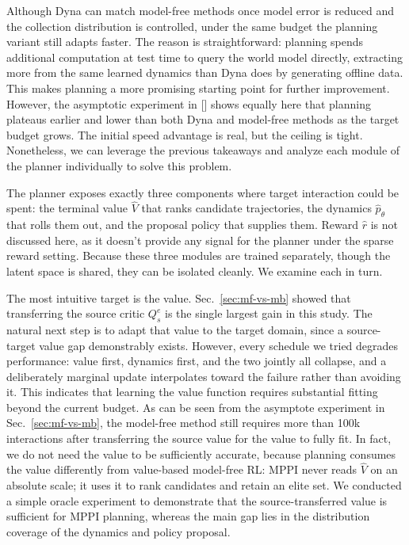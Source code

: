 \documentclass{article} %
\begin{document}
Although Dyna can match model-free methods once model error is reduced and the collection distribution is controlled, under the same budget the planning variant still adapts faster. The reason is straightforward: planning spends additional computation at test time to query the world model directly, extracting more from the same learned dynamics than Dyna does by generating offline data. This makes planning a more promising starting point for further improvement. However, the asymptotic experiment in [] shows equally here that planning plateaus earlier and lower than both Dyna and model-free methods as the target budget grows. The initial speed advantage is real, but the ceiling is tight. Nonetheless, we can leverage the previous takeaways and analyze each module of the planner individually to solve this problem.

The planner exposes exactly three components where target interaction could be spent: the terminal value $\hat V$ that ranks candidate trajectories, the dynamics $\hat p_\theta$ that rolls them out, and the proposal policy that supplies them. Reward $\hat r$ is not discussed here, as it doesn't provide any signal for the planner under the sparse reward setting. Because these three modules are trained separately, though the latent space is shared, they can be isolated cleanly. We examine each in turn.

The most intuitive target is the value. Sec.~\ref{sec:mf-vs-mb} showed that transferring the source critic $Q^e_s$ is the single largest gain in this study. The natural next step is to adapt that value to the target domain, since a source-target value gap demonstrably exists. However, every schedule we tried degrades performance: value first, dynamics first, and the two jointly all collapse, and a deliberately marginal update interpolates toward the failure rather than avoiding it. This indicates that learning the value function requires substantial fitting beyond the current budget. As can be seen from the asymptote experiment in Sec.~\ref{sec:mf-vs-mb}, the model-free method still requires more than 100k interactions after transferring the source value for the value to fully fit. In fact, we do not need the value to be sufficiently accurate, because planning consumes the value differently from value-based model-free RL: MPPI never reads $\hat V$ on an absolute scale; it uses it to rank candidates and retain an elite set. We conducted a simple oracle experiment to demonstrate that the source-transferred value is sufficient for MPPI planning, whereas the main gap lies in the distribution coverage of the dynamics and policy proposal. 
\end{document}
